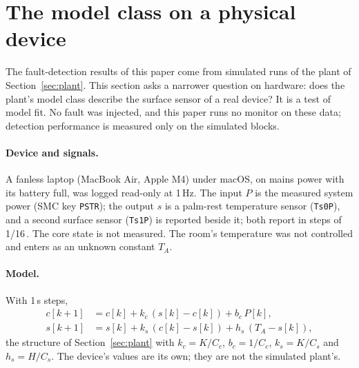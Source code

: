 
\section{The model class on a physical device}\label{sec:device}

The fault-detection results of this paper come from simulated runs of the plant of Section~\ref{sec:plant}. This
section asks a narrower question on hardware: does the plant's model class describe the surface sensor of a real
device? It is a test of model fit. No fault was injected, and this paper runs no monitor on these data; detection performance is
measured only on the simulated blocks.

\paragraph{Device and signals.} A fanless laptop (MacBook Air, Apple M4) under macOS, on mains power with its battery
full, was logged read-only at 1\,Hz. The input $P$ is the measured system power (SMC key \texttt{PSTR}); the output
$s$ is a palm-rest temperature sensor (\texttt{Ts0P}), and a second surface sensor (\texttt{Ts1P}) is reported beside
it; both report in steps of 1/16\,\degC. The core state is not measured. The room's temperature was not controlled and enters as an unknown constant
$T_A$.

\paragraph{Model.} With 1\,s steps,
\begin{align*}
c[k+1] &= c[k] + k_c\,(s[k]-c[k]) + b_c\,P[k],\\
s[k+1] &= s[k] + k_s\,(c[k]-s[k]) + h_s\,(T_A-s[k]),
\end{align*}
the structure of Section~\ref{sec:plant} with $k_c = K/C_c$, $b_c = 1/C_c$, $k_s = K/C_s$ and $h_s = H/C_s$. The
device's values are its own; they are not the simulated plant's.

